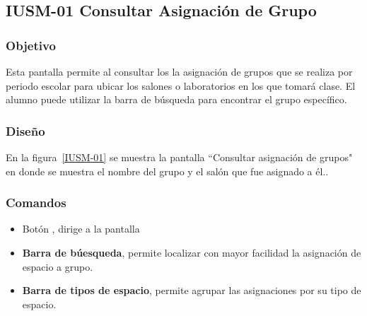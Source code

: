 \subsection{IUSM-01 Consultar Asignación de Grupo}

\subsubsection{Objetivo}

	
    Esta pantalla permite al  consultar los la asignación de grupos que se realiza por periodo escolar para ubicar los salones o laboratorios en los que tomará clase. El alumno puede utilizar la barra de búsqueda para encontrar el grupo específico.
\subsubsection{Diseño}


    En la figura~\ref{IUSM-01} se muestra la pantalla ``Consultar asignación de grupos" en donde se muestra el nombre del grupo y el salón que fue asignado a él..
    
    


\subsubsection{Comandos}
    \begin{itemize}

	\item Botón , dirige a la pantalla 
	\item \textbf{Barra de búesqueda}, permite localizar con mayor facilidad la asignación de espacio a grupo.
	\item \textbf{Barra de tipos de espacio}, permite agrupar las asignaciones por su tipo de espacio.
    \end{itemize}
